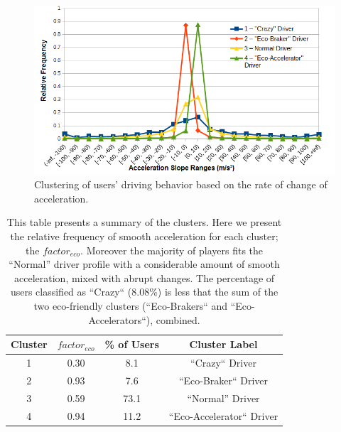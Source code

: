 \documentclass[preprint,authoryear,12pt]{elsarticle}
\begin{document}
\begin{figure}[tb]
	\begin{center}
		\includegraphics[width=1\linewidth]{ijhcs14-img/kmeansclustering}
		\caption{Clustering of users' driving behavior based on the rate of change of acceleration. \label{fig:accel-ranges}}
	\end{center}
\end{figure}

\begin{table}[!htb]
	\renewcommand*{\arraystretch}{1.4}
	\caption{This table presents a summary of the clusters. Here we present the relative frequency of smooth acceleration for each cluster; the $factor_{eco}$. Moreover the majority of players fits the ``Normal'' driver profile with a considerable amount of smooth acceleration, mixed with abrupt changes. The percentage of users classified as ``Crazy`` (8.08\%) is less that the sum of the two eco-friendly clusters (``Eco-Brakers`` and ``Eco-Accelerators``), combined. }
	\begin{center}
		\begin{tabular}{c|c|c|c}
			Cluster & $factor_{eco}$ & \% of Users & Cluster Label \\
			\hline
			1 &	 0.30
			& 8.1  & ``Crazy`` Driver  \\
			
			2 & 0.93
			& 7.6  &  ``Eco-Braker`` Driver \\
			
			3 &	 0.59
			& 73.1  &  ``Normal'' Driver  \\
			
			4 & 0.94
			& 11.2  &  ``Eco-Accelerator`` Driver \\
		\end{tabular}
	\end{center}
	\label{T:factors}
\end{table}
\end{document}

